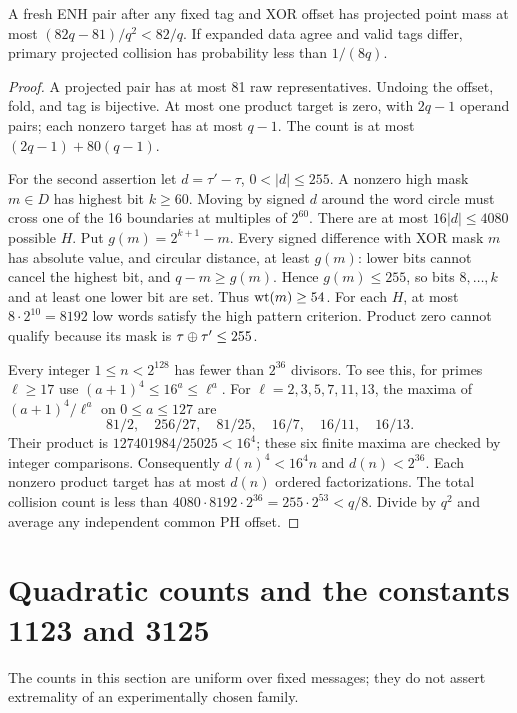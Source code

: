 \begin{lemma}\label{lem:points}
A fresh ENH pair after any fixed tag and XOR offset has projected point mass at most $(82q-81)/q^2<82/q$. If expanded data agree and valid tags differ, primary projected collision has probability less than $1/(8q)$.
\end{lemma}
\begin{proof}
A projected pair has at most 81 raw representatives. Undoing the offset, fold, and tag is bijective. At most one product target is zero, with $2q-1$ operand pairs; each nonzero target has at most $q-1$. The count is at most $(2q-1)+80(q-1)$.

For the second assertion let $d=\tau'-\tau$, $0<|d|\le255$. A nonzero high mask $m\in D$ has highest bit $k\ge60$. Moving by signed $d$ around the word circle must cross one of the 16 boundaries at multiples of $2^{60}$. There are at most $16|d|\le4080$ possible $H$. Put $g(m)=2^{k+1}-m$. Every signed difference with XOR mask $m$ has absolute value, and circular distance, at least $g(m)$: lower bits cannot cancel the highest bit, and $q-m\ge g(m)$. Hence $g(m)\le255$, so bits $8,\ldots,k$ and at least one lower bit are set. Thus $\operatorname{wt}(m)\ge54$. For each $H$, at most $8\cdot2^{10}=8192$ low words satisfy the high pattern criterion. Product zero cannot qualify because its mask is $\tau\mathbin\oplus\tau'\le255$.

Every integer $1\le n<2^{128}$ has fewer than $2^{36}$ divisors. To see this, for primes $\ell\ge17$ use $(a+1)^4\le16^a\le\ell^a$. For $\ell=2,3,5,7,11,13$, the maxima of $(a+1)^4/\ell^a$ on $0\le a\le127$ are
\[
 81/2,\quad256/27,\quad81/25,\quad16/7,\quad16/11,\quad16/13.
\]
Their product is $127401984/25025<16^4$; these six finite maxima are checked by integer comparisons. Consequently $d(n)^4<16^4 n$ and $d(n)<2^{36}$. Each nonzero product target has at most $d(n)$ ordered factorizations. The total collision count is less than
$4080\cdot8192\cdot2^{36}=255\cdot2^{53}<q/8$.
Divide by $q^2$ and average any independent common PH offset.
\end{proof}

\section{Quadratic counts and the constants 1123 and 3125}\label{sec:quadratic}
The counts in this section are uniform over fixed messages; they do not assert extremality of an experimentally chosen family.


